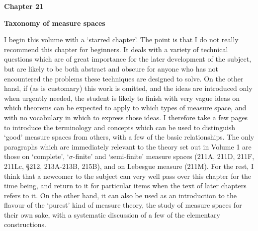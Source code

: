  
\def\chaptername{Taxonomy of measure spaces} 
 
\gdef\topparagraph{} 
   \gdef\bottomparagraph{Chap.\ 21 {\it intro.}} 
   \gdef\newparagraph{Chap.\ 21 {\it intro.}} 
   \gdef\sectionname{Introduction} 
   \gdef\headlinesectionname{Introduction} 
   \centerline{\bf *Chapter 21} 
   \medskip 
   \centerline{\bf \chaptername} 
   \medskip 
 
I begin this volume with a `starred chapter'.   The point is that I do 
not really recommend this chapter for beginners.   It deals with a 
variety of technical questions which are of great importance for the 
later development of the subject, but are likely to be both abstract and 
obscure for anyone who has not encountered the problems these techniques 
are designed to solve.   On the other hand, if (as is customary) this 
work is omitted, and the ideas are introduced only when urgently needed, 
the student is likely to finish with very vague ideas on which theorems 
can be expected to apply to which types of measure space, and with no 
vocabulary in which to express those ideas.   I therefore 
take a few pages to introduce the terminology and concepts which can be 
used to distinguish `good' measure spaces from others, with a few of 
the basic relationships.   The only paragraphs which are immediately 
relevant to the theory set out in Volume 1 are those on `complete',  
`$\sigma$-finite' and 
`semi-finite' measure spaces (211A, 211D, 211F, 211Lc, \S212,  
213A-213B, 215B), and on Lebesgue measure (211M).   For the rest, I think  
that a newcomer 
to the subject can very well pass over this chapter for the time being, and return to it 
for particular items when the text of later chapters refers to it. 
On the other hand, it can also be used as an introduction to the flavour  
of the `purest' kind of measure theory, the study of measure spaces for  
their own sake, with a systematic discussion of a few of the elementary  
constructions. 
 
\discrpage 
 
